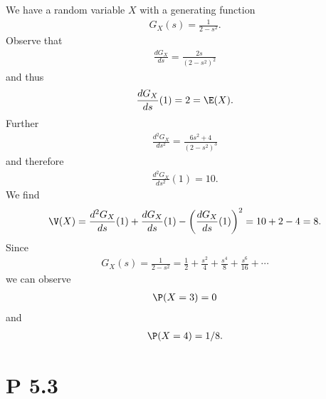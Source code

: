 \documentclass{article}
\begin{document}
We have a random variable $X$ with a generating function
\begin{align*}
  G_X(s) = \frac{1}{2-s^2}.
\end{align*}
Observe that
\begin{align*}
  \frac{dG_X}{ds} = \frac{2s}{(2-s^2)^2}
\end{align*}
and thus
\begin{align*}
  \frac{dG_X}{ds}(1) = 2 = \E(X).
\end{align*}
Further
\begin{align*}
  \frac{d^2G_X}{ds^2}=\frac{6s^2+4}{(2-s^2)^3}
\end{align*}
and therefore
\begin{align*}
  \frac{d^2G_X}{ds^2}(1) = 10.
\end{align*}
We find
\begin{align*}
  \V(X) = \frac{d^2G_X}{ds}(1) + \frac{dG_X}{ds}(1) - \left(\frac{dG_X}{ds}(1)\right)^2
  = 10 + 2 - 4 = 8.
\end{align*}
Since
\begin{align*}
  G_X(s) = \frac{1}{2-s^2} = \frac{1}{2} + \frac{s^2}{4} + \frac{s^4}{8} + \frac{s^6}{16} + \cdots
\end{align*}
we can observe
\begin{align*}
  \P(X=3) = 0
\end{align*}
and
\begin{align*}
  \P(X=4) = 1/8.
\end{align*}


\section*{P 5.3}
\end{document}

